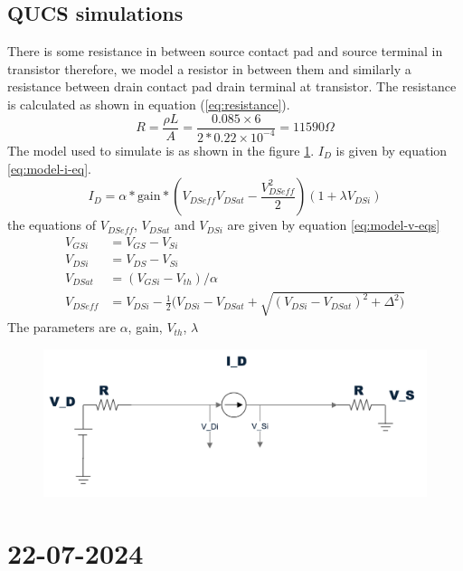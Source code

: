 \documentclass{article}
\begin{document}
\subsection*{QUCS simulations}
There is some resistance in between source contact pad and source terminal in transistor therefore, we model a resistor in between them and similarly a resistance between drain contact pad drain terminal at transistor. The resistance is calculated as shown in equation (\ref{eq:resistance}). 
\begin{equation}
    \label{eq:resistance}
                 R = \frac{\rho L}{A} = \frac{0.085 \times 6}{2*0.22 \times10^{-4}} = 11590 \Omega
\end{equation}
The model used to simulate is as shown in the figure \ref{fig:model-1}. $I_D$ is given by equation \ref{eq:model-i-eq}. 
\begin{equation}
    \label{eq:model-i-eq}
    \boxed{I_{D} = \alpha*\text{gain}*(V_{DSeff}V_{DSat}-\frac{V_{DSeff}^2}{2})(1+\lambda V_{DSi})}
\end{equation}
the equations of $V_{DSeff}$, $V_{DSat}$ and $V_{DSi}$ are given by equation \ref{eq:model-v-eqs}
\begin{align}
    \label{eq:model-v-eqs}
    V_{GSi}   &= V_{GS} - V_{Si} \\
    V_{DSi}   &= V_{DS} - V_{Si} \\
    V_{DSat}  &= (V_{GSi} - V_{th})/\alpha \\
    V_{DSeff} &= V_{DSi} - \frac{1}{2}(V_{DSi}-V_{DSat}+\sqrt{(V_{DSi}-V_{DSat})^2+\Delta^2)}
\end{align}
The parameters are $\alpha$, gain, $V_{th}$, $\lambda$
\begin{figure}
    \label{fig:model-1}
    \includegraphics[scale=0.4]{../Images/Previous/model-1.png}
\end{figure}
\newpage
\section{22-07-2024}
\end{document}
